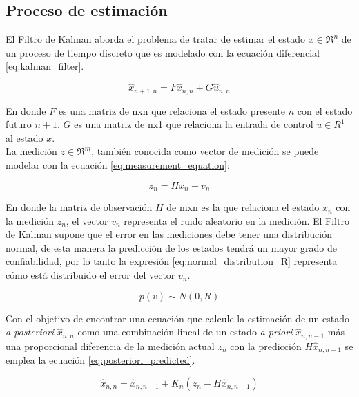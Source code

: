 		\subsection*{Proceso de estimación}
		El Filtro de Kalman aborda el problema de tratar de estimar el estado $x \in \Re^n$ de un proceso de tiempo discreto que es modelado con la ecuación diferencial \ref{eq:kalman_filter}.
		
\begin{equation}
\hat{x}_{n+1,n} = F \hat{x}_{n,n} + G \hat{u}_{n,n}
\label{eq:kalman_filter}
\end{equation}

	En donde $F$ es una matriz de nxn que relaciona el estado presente $n$ con el estado futuro $n+1$. $G$ es una matriz de nx1 que relaciona la entrada de control $u \in R^1$ al estado $x$. 
\\
	La medición $z \in \Re^m$, también conocida como vector de medición se puede modelar con la ecuación \ref{eq:measurement_equation}:

\begin{equation}
z_n = Hx_n+v_n
\label{eq:measurement_equation}
\end{equation}

En donde la matriz de observación $H$ de mxn es la que relaciona el estado $x_n$ con la medición $z_n$, el vector $v_n$ representa el ruido aleatorio en la medición. El Filtro de Kalman supone que el error en las mediciones debe tener una distribución normal, de esta manera la predicción de los estados tendrá un mayor grado de confiabilidad, por lo tanto la expresión \ref{eq:normal_distribution_R} representa cómo está distribuido el error del vector $v_n$. 

\begin{equation}
p(v) \sim N(0,R)
\label{eq:normal_distribution_R}
\end{equation}

Con el objetivo de encontrar una ecuación que calcule la estimación de un estado \textit{a posteriori} $\hat{x}_{n,n}$ como una combinación lineal de un estado \textit{a priori} $\hat{x}_{n, n-1}$ más una proporcional diferencia de la medición actual $z_n$ con la predicción $H\hat{x}_{n,n-1}$ se emplea la ecuación \ref{eq:posteriori_predicted}.

\begin{equation}
\hat{x}_{n,n} = \hat{x}_{n,n-1} + K_n (z_n-H\hat{x}_{n,n-1})
\label{eq:posteriori_predicted}
\end{equation}

